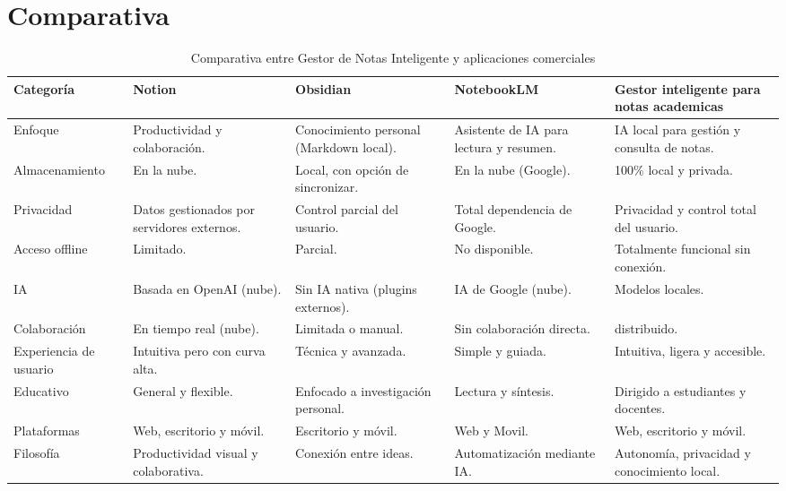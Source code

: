 \section{Comparativa}
\begin{table}[H]
\centering
\scriptsize
\caption{Comparativa entre Gestor de Notas Inteligente y aplicaciones comerciales}\label{tab:comparativa_final}
\renewcommand{\arraystretch}{0.9}
\begin{tabularx}{\textwidth}{p{2.3cm} X X X X}
\toprule
\textbf{Categoría} & \textbf{Notion} & \textbf{Obsidian} & \textbf{NotebookLM} & \textbf{Gestor inteligente para notas academicas} \\
\midrule
Enfoque & Productividad y colaboración. & Conocimiento personal (Markdown local). & Asistente de IA para lectura y resumen. & IA local para gestión y consulta de notas. \\
\addlinespace
Almacenamiento & En la nube. & Local, con opción de sincronizar. & En la nube (Google). & 100\% local y privada. \\
\addlinespace
Privacidad & Datos gestionados por servidores externos. & Control parcial del usuario. & Total dependencia de Google. & Privacidad y control total del usuario. \\
\addlinespace
Acceso offline & Limitado. & Parcial. & No disponible. & Totalmente funcional sin conexión. \\
\addlinespace
IA & Basada en OpenAI (nube). & Sin IA nativa (plugins externos). & IA de Google (nube). & Modelos locales. \\
\addlinespace
Colaboración & En tiempo real (nube). & Limitada o manual. & Sin colaboración directa. & distribuido. \\
\addlinespace
Experiencia de usuario & Intuitiva pero con curva alta. & Técnica y avanzada. & Simple y guiada. & Intuitiva, ligera y accesible. \\
\addlinespace
Educativo & General y flexible. & Enfocado a investigación personal. & Lectura y síntesis. & Dirigido a estudiantes y docentes. \\
\addlinespace
Plataformas & Web, escritorio y móvil. & Escritorio y móvil. & Web y Movil. & Web, escritorio y móvil. \\
\addlinespace
Filosofía & Productividad visual y colaborativa. & Conexión entre ideas. & Automatización mediante IA. & Autonomía, privacidad y conocimiento local. \\
\bottomrule
\end{tabularx}
\end{table}

